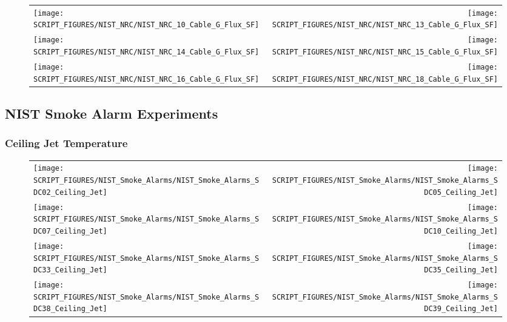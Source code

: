 \begin{figure}[!ht]
\begin{tabular*}{\textwidth}{l@{\extracolsep{\fill}}r}
\texttt{[image: SCRIPT\_FIGURES/NIST\_NRC/NIST\_NRC\_10\_Cable\_G\_Flux\_SF]} &
\texttt{[image: SCRIPT\_FIGURES/NIST\_NRC/NIST\_NRC\_13\_Cable\_G\_Flux\_SF]} \\
\texttt{[image: SCRIPT\_FIGURES/NIST\_NRC/NIST\_NRC\_14\_Cable\_G\_Flux\_SF]} &
\texttt{[image: SCRIPT\_FIGURES/NIST\_NRC/NIST\_NRC\_15\_Cable\_G\_Flux\_SF]} \\
\texttt{[image: SCRIPT\_FIGURES/NIST\_NRC/NIST\_NRC\_16\_Cable\_G\_Flux\_SF]} &
\texttt{[image: SCRIPT\_FIGURES/NIST\_NRC/NIST\_NRC\_18\_Cable\_G\_Flux\_SF]}
\end{tabular*}
\end{figure}

\clearpage

\subsection{NIST Smoke Alarm Experiments}

\subsubsection{Ceiling Jet Temperature}

\begin{figure}[!ht]
\begin{tabular*}{\textwidth}{l@{\extracolsep{\fill}}r}
\texttt{[image: SCRIPT\_FIGURES/NIST\_Smoke\_Alarms/NIST\_Smoke\_Alarms\_SDC02\_Ceiling\_Jet]} &
\texttt{[image: SCRIPT\_FIGURES/NIST\_Smoke\_Alarms/NIST\_Smoke\_Alarms\_SDC05\_Ceiling\_Jet]} \\
\texttt{[image: SCRIPT\_FIGURES/NIST\_Smoke\_Alarms/NIST\_Smoke\_Alarms\_SDC07\_Ceiling\_Jet]} &
\texttt{[image: SCRIPT\_FIGURES/NIST\_Smoke\_Alarms/NIST\_Smoke\_Alarms\_SDC10\_Ceiling\_Jet]} \\
\texttt{[image: SCRIPT\_FIGURES/NIST\_Smoke\_Alarms/NIST\_Smoke\_Alarms\_SDC33\_Ceiling\_Jet]} &
\texttt{[image: SCRIPT\_FIGURES/NIST\_Smoke\_Alarms/NIST\_Smoke\_Alarms\_SDC35\_Ceiling\_Jet]} \\
\texttt{[image: SCRIPT\_FIGURES/NIST\_Smoke\_Alarms/NIST\_Smoke\_Alarms\_SDC38\_Ceiling\_Jet]} &
\texttt{[image: SCRIPT\_FIGURES/NIST\_Smoke\_Alarms/NIST\_Smoke\_Alarms\_SDC39\_Ceiling\_Jet]}
\end{tabular*}
\end{figure}

